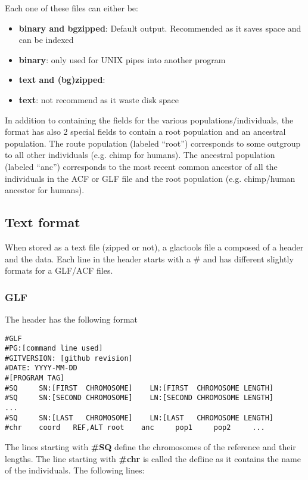 \documentclass[a4paper]{article}
\begin{document}
\noindent  Each one of these files can either be:
\begin{itemize}
\item {\bf binary and bgzipped}: Default output. Recommended as it saves space and can be indexed
\item {\bf binary}:  only used for UNIX pipes into another program
\item {\bf text and (bg)zipped}: 
\item {\bf text}: not recommend as it waste disk space
\end{itemize}

\noindent In addition to containing the fields for the various populations/individuals, the format  has also 2 special fields to contain a root population and an ancestral population.  The route population (labeled  ``root'') corresponds to some outgroup to all other individuals (e.g. chimp for humans).  The ancestral population (labeled  ``anc'')  corresponds to the most recent common ancestor of all the individuals in the ACF or GLF file and the root population (e.g. chimp/human ancestor for humans).
\subsection{Text format}


When stored as a text file (zipped or not), a glactools file a composed of a header and the data. Each line in the header starts with a \# and has different slightly formats for a GLF/ACF files.

\subsubsection{GLF} 
\label{text:glf}
\noindent The header has the following format

\begin{lstlisting}
#GLF
#PG:[command line used]
#GITVERSION: [github revision]
#DATE: YYYY-MM-DD
#[PROGRAM TAG]
#SQ     SN:[FIRST  CHROMOSOME]    LN:[FIRST  CHROMOSOME LENGTH]
#SQ     SN:[SECOND CHROMOSOME]    LN:[SECOND CHROMOSOME LENGTH]
...
#SQ     SN:[LAST   CHROMOSOME]    LN:[LAST   CHROMOSOME LENGTH]
#chr    coord   REF,ALT root    anc     pop1     pop2     ...
\end{lstlisting}


\noindent The lines starting with {\bf \#SQ} define the chromosomes of the reference and their lengths. The line starting with {\bf \#chr} is called the defline as it contains the name of the individuals. The following lines:
\end{document}

